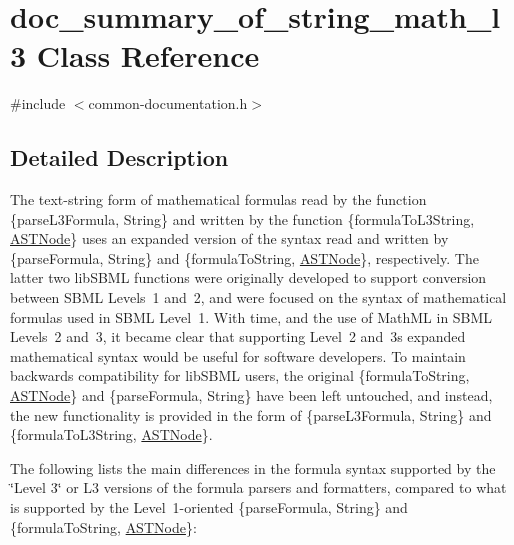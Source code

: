\hypertarget{classdoc__summary__of__string__math__l3}{}\section{doc\+\_\+summary\+\_\+of\+\_\+string\+\_\+math\+\_\+l3 Class Reference}
\label{classdoc__summary__of__string__math__l3}


{\ttfamily \#include $<$common-\/documentation.\+h$>$}



\subsection{Detailed Description}
\begin{DoxyParagraph}{}
The text-\/string form of mathematical formulas read by the function \{parse\+L3\+Formula, String\} and written by the function \{formula\+To\+L3\+String, \hyperlink{class_a_s_t_node}{A\+S\+T\+Node}\} uses an expanded version of the syntax read and written by \{parse\+Formula, String\} and \{formula\+To\+String, \hyperlink{class_a_s_t_node}{A\+S\+T\+Node}\}, respectively. The latter two lib\+S\+B\+ML functions were originally developed to support conversion between S\+B\+ML Levels~1 and~2, and were focused on the syntax of mathematical formulas used in S\+B\+ML Level~1. With time, and the use of Math\+ML in S\+B\+ML Levels~2 and~3, it became clear that supporting Level~2 and~3\textquotesingle{}s expanded mathematical syntax would be useful for software developers. To maintain backwards compatibility for lib\+S\+B\+ML users, the original \{formula\+To\+String, \hyperlink{class_a_s_t_node}{A\+S\+T\+Node}\} and \{parse\+Formula, String\} have been left untouched, and instead, the new functionality is provided in the form of \{parse\+L3\+Formula, String\} and \{formula\+To\+L3\+String, \hyperlink{class_a_s_t_node}{A\+S\+T\+Node}\}.
\end{DoxyParagraph}
The following lists the main differences in the formula syntax supported by the \char`\"{}\+Level 3\char`\"{} or L3 versions of the formula parsers and formatters, compared to what is supported by the Level~1-\/oriented \{parse\+Formula, String\} and \{formula\+To\+String, \hyperlink{class_a_s_t_node}{A\+S\+T\+Node}\}\+:

